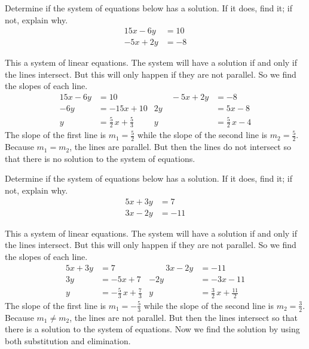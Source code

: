 \documentclass[11pt,letterpaper]{article}
\begin{document}
\newpage





 Determine if the system of equations below has a solution. If it does, find it; if not, explain why. \pspace
	\[
	\begin{aligned}
	15x - 6y&= 10 \\
	-5x + 2y&= -8
	\end{aligned}
	\] \pspace

\sol This a system of linear equations. The system will have a solution if and only if the lines intersect. But this will only happen if they are not parallel. So we find the slopes of each line.
	\[
	\begin{aligned}
	15x - 6y&= 10 &\quad\quad -5x + 2y&= -8 \\
	-6y&= -15x + 10 & 2y&= 5x - 8 \\
	y&= \frac{5}{2}\,x + \frac{5}{3} & y&= \frac{5}{2}\,x - 4
	\end{aligned}
	\]
The slope of the first line is $m_1= \frac{5}{2}$ while the slope of the second line is $m_2= \frac{5}{2}$. Because $m_1= m_2$, the lines are parallel. But then the lines do not intersect so that there is no solution to the system of equations. 





\newpage





 Determine if the system of equations below has a solution. If it does, find it; if not, explain why. 
	\[
	\begin{aligned}
	5x + 3y&= 7 \\
	3x - 2y&= -11
	\end{aligned}
	\] 

\sol This a system of linear equations. The system will have a solution if and only if the lines intersect. But this will only happen if they are not parallel. So we find the slopes of each line.
	\[
	\begin{aligned}
	5x + 3y&= 7 &\quad\quad 3x - 2y&= -11 \\
	3y&= -5x + 7 & -2y&= -3x - 11 \\
	y&= -\frac{5}{3}\,x + \frac{7}{3} & y&= \frac{3}{2}\,x + \frac{11}{2}
	\end{aligned}
	\]
The slope of the first line is $m_1= -\frac{5}{3}$ while the slope of the second line is $m_2= \frac{3}{2}$. Because $m_1 \neq m_2$, the lines are not parallel. But then the lines intersect so that there is a solution to the system of equations. Now we find the solution by using both substitution and elimination. 
\end{document}
